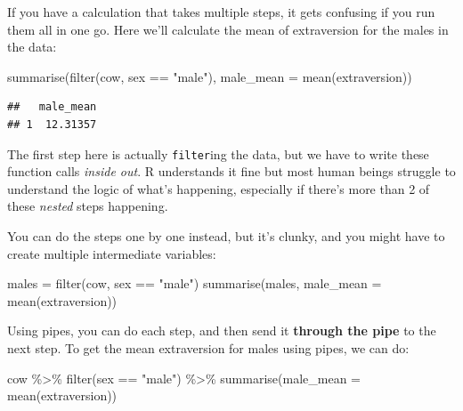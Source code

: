 \documentclass[
]{book}
\newenvironment{Shaded}{\begin{snugshade}}{\end{snugshade}}
\newcommand{\AttributeTok}[1]{\textcolor[rgb]{0.77,0.63,0.00}{#1}}
\newcommand{\FunctionTok}[1]{\textcolor[rgb]{0.00,0.00,0.00}{#1}}
\newcommand{\NormalTok}[1]{#1}
\newcommand{\OtherTok}[1]{\textcolor[rgb]{0.56,0.35,0.01}{#1}}
\newcommand{\SpecialCharTok}[1]{\textcolor[rgb]{0.00,0.00,0.00}{#1}}
\newcommand{\StringTok}[1]{\textcolor[rgb]{0.31,0.60,0.02}{#1}}
\begin{document}
If you have a calculation that takes multiple steps, it gets
confusing if you run them all in one go. Here we'll calculate
the mean of extraversion for the males in the data:

\begin{Shaded}
\begin{Highlighting}[]
\FunctionTok{summarise}\NormalTok{(}\FunctionTok{filter}\NormalTok{(cow, sex }\SpecialCharTok{==} \StringTok{"male"}\NormalTok{), }\AttributeTok{male\_mean =} \FunctionTok{mean}\NormalTok{(extraversion))}
\end{Highlighting}
\end{Shaded}

\begin{verbatim}
##   male_mean
## 1  12.31357
\end{verbatim}

The first step here is actually \texttt{filter}ing the data, but
we have to write these function calls \emph{inside out}. R understands
it fine but most human beings struggle to understand the logic
of what's happening, especially if there's more than 2 of
these \emph{nested} steps happening.

You can do the steps one by one instead, but it's clunky, and you
might have to create multiple intermediate variables:

\begin{Shaded}
\begin{Highlighting}[]
\NormalTok{males }\OtherTok{=} \FunctionTok{filter}\NormalTok{(cow, sex }\SpecialCharTok{==} \StringTok{"male"}\NormalTok{)}
\FunctionTok{summarise}\NormalTok{(males, }\AttributeTok{male\_mean =} \FunctionTok{mean}\NormalTok{(extraversion))}
\end{Highlighting}
\end{Shaded}

Using pipes, you can do each step, and then send it \textbf{through
the pipe} to the next step. To get the mean extraversion
for males using pipes, we can do:

\begin{Shaded}
\begin{Highlighting}[]
\NormalTok{cow }\SpecialCharTok{\%\textgreater{}\%}
    \FunctionTok{filter}\NormalTok{(sex }\SpecialCharTok{==} \StringTok{"male"}\NormalTok{) }\SpecialCharTok{\%\textgreater{}\%}
    \FunctionTok{summarise}\NormalTok{(}\AttributeTok{male\_mean =} \FunctionTok{mean}\NormalTok{(extraversion))}
\end{Highlighting}
\end{Shaded}
\end{document}
